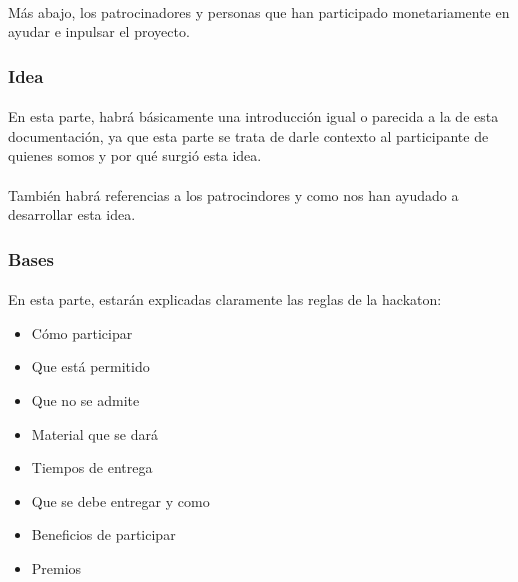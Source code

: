 \documentclass[a4paper]{article}
\begin{document}
    \paragraph{}
    Más abajo, los patrocinadores y personas que han participado monetariamente 
    en ayudar e inpulsar el proyecto.
    \subsubsection[/idea]{Idea}
    \paragraph{}
    En esta parte, habrá básicamente una introducción igual o parecida a la 
    de esta documentación, ya que esta parte se trata de darle contexto al 
    participante de quienes somos y por qué surgió esta idea.
    \paragraph{}
    También habrá referencias a los patrocindores y como nos han ayudado a 
    desarrollar esta idea.
    \subsubsection[/bases]{Bases}
    \paragraph{}
    En esta parte, estarán explicadas claramente las reglas de 
    la hackaton:
    \begin{itemize}
        \item Cómo participar
        \item Que está permitido
        \item Que no se admite
        \item Material que se dará
        \item Tiempos de entrega
        \item Que se debe entregar y como 
        \item Beneficios de participar 
        \item Premios
    \end{itemize}
\end{document}
